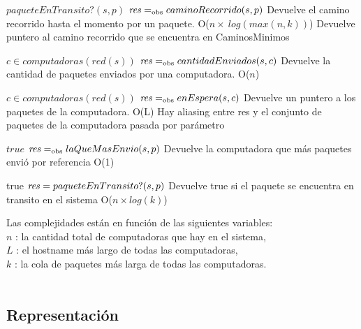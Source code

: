  {$paqueteEnTransito?(s,p)$}
 {$\text{\textit{res}} =_{\mathrm{obs}} caminoRecorrido(s,p)$}
 {Devuelve el camino recorrido hasta el momento por un paquete.}
 {O($n \times\  log(max(n,k))$)}
 {Devuelve puntero al camino recorrido que se encuentra en CaminosMinimos}

 {$c \in computadoras(red(s))$}
 {$\text{\textit{res}} =_{\mathrm{obs}} cantidadEnviados(s,c)$}
 {Devuelve la cantidad de paquetes enviados por una computadora.}
 {O($n$)} %
{}

 
 {$c \in computadoras(red(s))$}
 {$\text{\textit{res}} =_{\mathrm{obs}} enEspera(s,c)$}
 {Devuelve un puntero a los paquetes de la computadora.}
 {O(L)}
 {Hay aliasing entre res y el conjunto de paquetes de la computadora pasada por parámetro}

 
 {$true$}
 {$\text{\textit{res}} =_{\mathrm{obs}} laQueMasEnvio(s,p)$}
 {Devuelve la computadora que más paquetes envió por referencia} 
 {O(1)}
 
 

 
{true}
{$\text{\textit{res}} = paqueteEnTransito?(s,p)$}
{Devuelve true si el paquete se encuentra en transito en el sistema}
{O($n \times log(k)$)}
{}

 
Las complejidades están en función de las siguientes variables:\\
$n$ : la cantidad total de computadoras que hay en el sistema, \\
$L$ : el hostname más largo de todas las computadoras, \\
$k$ : la cola de paquetes más larga de todas las computadoras. 
\\ \\



\subsection{Representación}



